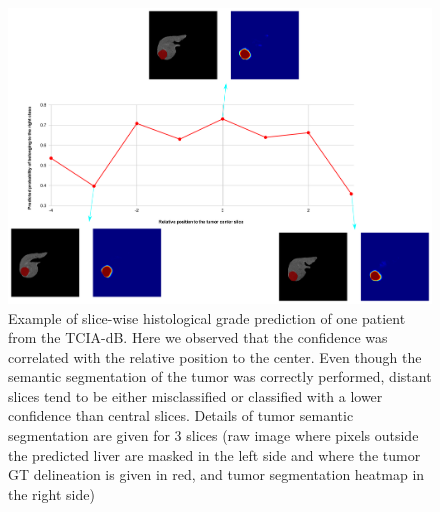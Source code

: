 \documentclass[]{article}
\newcommand{\lmttfont}[1]{{\fontfamily{lmtt}\selectfont #1}}
\begin{document}
\begin{figure}[th!]
	\centering
	\includegraphics[width=0.9\linewidth]{../HistologicalGradePrediction/images/Slice_hist_grad_prediction_v3}
	\caption{Example of slice-wise histological grade prediction of one patient from the \lmttfont{TCIA-dB}. Here we observed that the confidence was correlated with the relative position to the center. Even though the semantic segmentation of the tumor was correctly performed, distant slices tend to be either misclassified or classified with a lower confidence than central slices. Details of tumor semantic segmentation are given for 3 slices (raw image where pixels outside the predicted liver are masked in the left side and where the tumor GT delineation is given in red, and tumor segmentation heatmap in the right side)}
	\label{fig:Slice_hist_grad_prediction_2}
\end{figure}
\end{document}
